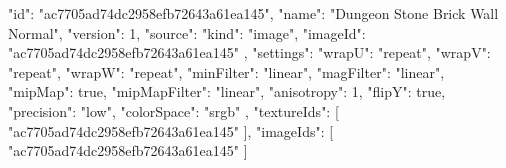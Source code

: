 {
  "id": "ac7705ad74dc2958efb72643a61ea145",
  "name": "Dungeon Stone Brick Wall Normal",
  "version": 1,
  "source": {
    "kind": "image",
    "imageId": "ac7705ad74dc2958efb72643a61ea145"
  },
  "settings": {
    "wrapU": "repeat",
    "wrapV": "repeat",
    "wrapW": "repeat",
    "minFilter": "linear",
    "magFilter": "linear",
    "mipMap": true,
    "mipMapFilter": "linear",
    "anisotropy": 1,
    "flipY": true,
    "precision": "low",
    "colorSpace": "srgb"
  },
  "textureIds": [
    "ac7705ad74dc2958efb72643a61ea145"
  ],
  "imageIds": [
    "ac7705ad74dc2958efb72643a61ea145"
  ]
}
